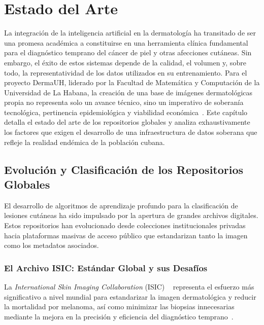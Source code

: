 \chapter{Estado del Arte}\label{ch:estado-del-arte}

La integración de la inteligencia artificial en la dermatología ha transitado de ser una promesa académica a 
constituirse en una herramienta clínica fundamental para el diagnóstico temprano del cáncer de piel y otras 
afecciones cutáneas. Sin embargo, el éxito de estos sistemas depende de la calidad, el volumen y, sobre todo, 
la representatividad de los datos utilizados en su entrenamiento. Para el proyecto DermaUH, liderado por la 
Facultad de Matemática y Computación de la Universidad de La Habana, la creación de una base de imágenes 
dermatológicas propia no representa solo un avance técnico, sino un imperativo de soberanía tecnológica, 
pertinencia epidemiológica y viabilidad económica~\cite{prensalatina_dermauh}. Este capítulo detalla 
el estado del arte de los repositorios globales y analiza exhaustivamente los factores que exigen el 
desarrollo de una infraestructura de datos soberana que refleje la realidad endémica de la población cubana.

\section{Evolución y Clasificación de los Repositorios Globales}\label{sec:repositorios-globales}

El desarrollo de algoritmos de aprendizaje profundo para la clasificación de lesiones cutáneas ha sido 
impulsado por la apertura de grandes archivos digitales. Estos repositorios han evolucionado desde 
colecciones institucionales privadas hacia plataformas masivas de acceso público que estandarizan tanto 
la imagen como los metadatos asociados.


\subsection{El Archivo ISIC: Estándar Global y sus Desafíos}\label{sec:isic}

La \textit{International Skin Imaging Collaboration} (ISIC) ~\cite{isic_home} representa el esfuerzo más significativo a nivel 
mundial para estandarizar la imagen dermatológica y reducir la mortalidad por melanoma, así como minimizar 
las biopsias innecesarias mediante la mejora en la precisión y eficiencia del diagnóstico 
temprano~\cite{itobos_isic,isic_mission}. 

